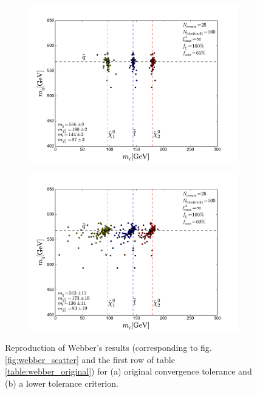 \documentclass[twoside,english]{uiofysmaster}
\begin{document}
\begin{figure}[hbt]
	\centering
	\begin{subfigure}[b]{0.8\textwidth}
		\includegraphics[width=\textwidth]{figures/webber_rec_table/webber_rec_table-samesettings_0psmear-nocut.pdf} 
		\caption{ }
		\label{fig:webber_rec_scatter_tolerance-comparison_a}
	\end{subfigure}

	\begin{subfigure}[b]{0.8\textwidth}
		\includegraphics[width=\textwidth]{figures/webber_rec_table/webber_HW-rec_nocut.pdf}
		\caption{ } 
		\label{fig:webber_rec_scatter_tolerance-comparison_b}
	\end{subfigure}
	\caption{Reproduction of Webber's results (corresponding to fig. \ref{fig:webber_scatter} and the first row of table \ref{table:webber_original}) for (a) original convergence tolerance and (b) a lower tolerance criterion.}
	\label{fig:webber_rec_scatter_tolerance-comparison}
\end{figure}
\end{document}
